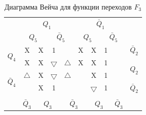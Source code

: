 \documentclass[a4paper,14pt]{article}
\begin{document}

\begin{table}[H]
	\begin{center}
		\caption{\label{tab:F3_tab} Диаграмма Вейча для функции переходов $F_3$ }
		\begin{tabular}{cccccccccc}
			& \multicolumn{4}{c}{$Q_1$} & \multicolumn{4}{c}{$\bar{Q}_1$} &  \\
			& \multicolumn{2}{c}{$Q_5$} & \multicolumn{2}{c}{$\bar{Q}_5$} & \multicolumn{2}{c}{$Q_5$} & \multicolumn{2}{c}{$\bar{Q}_5$} &  \\ \cline{2-9}
			\multicolumn{1}{c|}{\multirow{2}{*}{$Q_4$}} & \multicolumn{1}{c|}{X} & \multicolumn{1}{c|}{X} & \multicolumn{1}{c|}{1} & \multicolumn{1}{c|}{} & \multicolumn{1}{c|}{X} & \multicolumn{1}{c|}{X} & \multicolumn{1}{c|}{1} & \multicolumn{1}{c|}{} & $\bar{Q}_2$ \\ \cline{2-9}
			\multicolumn{1}{c|}{} & \multicolumn{1}{c|}{X} & \multicolumn{1}{c|}{X} & \multicolumn{1}{c|}{$\bigtriangledown$} & \multicolumn{1}{c|}{$\bigtriangleup$} & \multicolumn{1}{c|}{X} & \multicolumn{1}{c|}{X} & \multicolumn{1}{c|}{1} & \multicolumn{1}{c|}{} & \multirow{2}{*}{$Q_2$} \\ \cline{2-9}
			\multicolumn{1}{c|}{\multirow{2}{*}{$\bar{Q}_4$}} & \multicolumn{1}{c|}{$\bigtriangleup$} & \multicolumn{1}{c|}{X} & \multicolumn{1}{c|}{$\bigtriangledown$} & \multicolumn{1}{c|}{$\bigtriangleup$} & \multicolumn{1}{c|}{} & \multicolumn{1}{c|}{X} & \multicolumn{1}{c|}{1} & \multicolumn{1}{c|}{} &  \\ \cline{2-9}
			\multicolumn{1}{c|}{} & \multicolumn{1}{c|}{} & \multicolumn{1}{c|}{X} & \multicolumn{1}{c|}{1} & \multicolumn{1}{c|}{} & \multicolumn{1}{c|}{} & \multicolumn{1}{c|}{$\bigtriangledown$} & \multicolumn{1}{c|}{1} & \multicolumn{1}{c|}{} & $\bar{Q}_2$ \\ \cline{2-9}
			&  & \multicolumn{2}{c}{} & \multicolumn{2}{c}{} & \multicolumn{2}{c}{} &  &  \\
			& $\bar{Q}_3$ & \multicolumn{2}{c}{$Q_3$} & \multicolumn{2}{c}{$\bar{Q}_3$} & \multicolumn{2}{c}{$Q_3$} & $\bar{Q}_3$ & 
		\end{tabular}
	\end{center}
\end{table}

\end{document}

